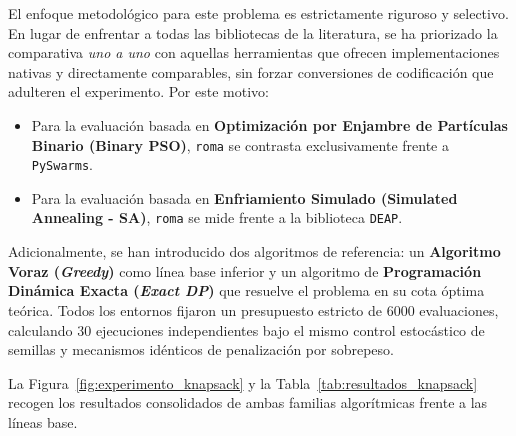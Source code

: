 \documentclass[12pt,a4paper,twoside,openright]{book}
\begin{document}
    El enfoque metodológico para este problema es estrictamente riguroso y selectivo. En lugar de enfrentar a todas las bibliotecas de la literatura, se ha priorizado la comparativa \textit{uno a uno} con aquellas herramientas que ofrecen implementaciones nativas y directamente comparables, sin forzar conversiones de codificación que adulteren el experimento. Por este motivo:
    \begin{itemize}
        \item Para la evaluación basada en \textbf{Optimización por Enjambre de Partículas Binario (Binary PSO)}, \texttt{roma} se contrasta exclusivamente frente a \texttt{PySwarms}.
        \item Para la evaluación basada en \textbf{Enfriamiento Simulado (Simulated Annealing - SA)}, \texttt{roma} se mide frente a la biblioteca \texttt{DEAP}.
    \end{itemize}
    Adicionalmente, se han introducido dos algoritmos de referencia: un \textbf{Algoritmo Voraz (\textit{Greedy})} como línea base inferior y un algoritmo de \textbf{Programación Dinámica Exacta (\textit{Exact DP})} que resuelve el problema en su cota óptima teórica. Todos los entornos fijaron un presupuesto estricto de $6000$ evaluaciones, calculando $30$ ejecuciones independientes bajo el mismo control estocástico de semillas y mecanismos idénticos de penalización por sobrepeso. 

    La Figura~\ref{fig:experimento_knapsack} y la Tabla~\ref{tab:resultados_knapsack} recogen los resultados consolidados de ambas familias algorítmicas frente a las líneas base.
\end{document}
